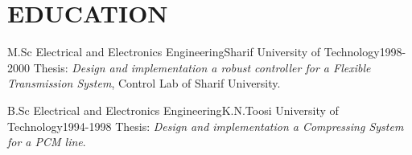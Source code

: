 \documentclass[10pt, a4paper]{article}
\begin{document}
\section{EDUCATION}
\begin{cvitem}{M.Sc}{ Electrical and Electronics Engineering}{Sharif University of Technology}{1998-2000}
    Thesis: \textit{Design and implementation a robust controller for a Flexible Transmission System}, Control Lab of Sharif University.
\end{cvitem}

\begin{cvitem}{B.Sc}{ Electrical and Electronics Engineering}{K.N.Toosi University of Technology}{1994-1998}
   Thesis: \textit{Design and implementation a Compressing System for a PCM line}.
\end{cvitem}



%
%




\fincols
\end{document}

